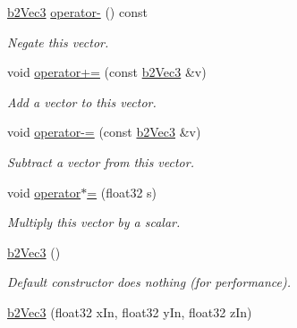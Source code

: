 \begin{DoxyCompactItemize}
\mbox{\label{structb2Vec3_a396e2b5b3c53a502859ff80544c27db8}} 
\hyperlink{structb2Vec3}{b2\+Vec3} \hyperlink{structb2Vec3_a396e2b5b3c53a502859ff80544c27db8}{operator-\/} () const
\begin{DoxyCompactList}\small\item\em Negate this vector. \end{DoxyCompactList}\item 
\mbox{\label{structb2Vec3_a2aaeed3f5308aad85d19c5f0efc72641}} 
void \hyperlink{structb2Vec3_a2aaeed3f5308aad85d19c5f0efc72641}{operator+=} (const \hyperlink{structb2Vec3}{b2\+Vec3} \&v)
\begin{DoxyCompactList}\small\item\em Add a vector to this vector. \end{DoxyCompactList}\item 
\mbox{\label{structb2Vec3_a9e5b535548e1c5dfc0dc258d08f5ca32}} 
void \hyperlink{structb2Vec3_a9e5b535548e1c5dfc0dc258d08f5ca32}{operator-\/=} (const \hyperlink{structb2Vec3}{b2\+Vec3} \&v)
\begin{DoxyCompactList}\small\item\em Subtract a vector from this vector. \end{DoxyCompactList}\item 
\mbox{\label{structb2Vec3_aaa9aa20195cd0ee53c7176a9a9b02389}} 
void \hyperlink{structb2Vec3_aaa9aa20195cd0ee53c7176a9a9b02389}{operator$\ast$=} (float32 s)
\begin{DoxyCompactList}\small\item\em Multiply this vector by a scalar. \end{DoxyCompactList}\item 
\mbox{\label{structb2Vec3_a837423f66d6fb72d815e7390c09938b9}} 
\hyperlink{structb2Vec3_a837423f66d6fb72d815e7390c09938b9}{b2\+Vec3} ()
\begin{DoxyCompactList}\small\item\em Default constructor does nothing (for performance). \end{DoxyCompactList}\item 
\mbox{\label{structb2Vec3_a5db4043a3ea58894562081f1f68195d9}} 
\hyperlink{structb2Vec3_a5db4043a3ea58894562081f1f68195d9}{b2\+Vec3} (float32 x\+In, float32 y\+In, float32 z\+In)

\end{DoxyCompactItemize}
